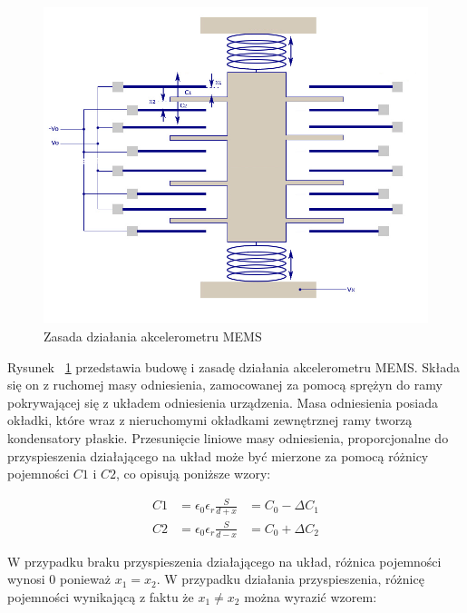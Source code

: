 \begin{figure}[H]
	\centering
	\includegraphics[scale=0.4]{Pictures/MEMS-Accelerometer_struct.png}
		\caption[Zasada działania akcelerometru MEMS]{Zasada działania akcelerometru MEMS}
	\label{fig:MEMS-Accelerometer_struct}
\end{figure}

Rysunek ~\ref{fig:MEMS-Accelerometer_struct} przedstawia budowę i zasadę działania akcelerometru MEMS. Składa się on z ruchomej masy odniesienia, zamocowanej za pomocą sprężyn do ramy pokrywającej się z układem odniesienia urządzenia. Masa odniesienia posiada okładki, które wraz z nieruchomymi okładkami zewnętrznej ramy tworzą kondensatory płaskie. Przesunięcie liniowe masy odniesienia, proporcjonalne do przyspieszenia działającego na układ może być mierzone za pomocą różnicy pojemności $C1$ i $C2$, co opisują poniższe wzory:

\begin{equation}
\begin{aligned}
C1 &= \epsilon_0\epsilon_r\frac{S}{d + x} &= C_0 - \Delta{C_1} \\
C2 &= \epsilon_0\epsilon_r\frac{S}{d - x} &= C_0 + \Delta{C_2}
\end{aligned}
\label{C_to_delta}
\end{equation} 

W przypadku braku przyspieszenia działającego na układ, różnica pojemności wynosi $0$ ponieważ $x_1 = x_2$. W przypadku działania przyspieszenia, różnicę pojemności wynikającą z faktu że $x_1 \neq x_2$ można wyrazić wzorem:


